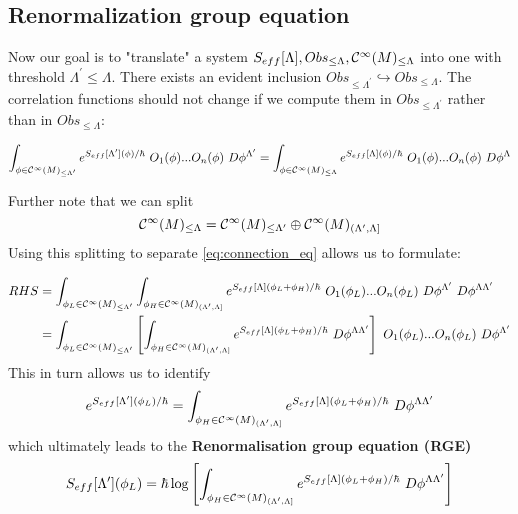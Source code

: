\subsection{Renormalization group equation}
\label{subsec:renorm_group_eq}

Now our goal is to "translate" a system $S_{eff}[\Lambda], Obs_{\leq \Lambda}, \mathcal{C}^{\infty}(M)_{\leq \Lambda}$ into one with threshold $\Lambda^\prime \leq \Lambda$. There exists an evident inclusion $Obs_{\leq \Lambda^\prime} \hookrightarrow Obs_{\leq \Lambda}$. The correlation functions should not change if we compute them in $Obs_{\leq \Lambda^\prime}$ rather than in $Obs_{\leq \Lambda}$:

\begin{align}
\label{eq:connection_eq}
  \int_{\phi \in \Ci(M)_{\leq \Lambda^\prime}} e^{S_{eff}[\Lambda^\prime] (\phi) / \hbar} \ O_1(\phi) ... O_n(\phi) \ D\phi^{\Lambda^\prime} = \int_{\phi \in \Ci(M)_{\leq \Lambda}} e^{S_{eff}[\Lambda] (\phi) / \hbar} \ O_1(\phi) ... O_n(\phi) \ D\phi^{\Lambda}
\end{align}

Further note that we can split
$$ \mathcal{C}^{\infty}(M)_{\leq \Lambda} = \mathcal{C}^{\infty}(M)_{\leq \Lambda^\prime} \oplus \mathcal{C}^{\infty}(M)_{(\Lambda^\prime,\Lambda]} $$
Using this splitting to separate \eqref{eq:connection_eq} allows us to formulate:

\begin{align*}
  RHS &= \int_{\phi_L \in \Ci(M)_{\leq \Lambda^\prime}}
  \int_{\phi_H \in \Ci(M)_{(\Lambda^\prime,\Lambda]}}
  e^{S_{eff}[\Lambda] (\phi_L + \phi_H) / \hbar} \ O_1(\phi_L) ... O_n(\phi_L) \ D\phi^{\Lambda^\prime} \ D\phi^{\Lambda \Lambda^\prime} \\
  &= \int_{\phi_L \in \Ci(M)_{\leq \Lambda^\prime}}
  \left [\int_{\phi_H \in \Ci(M)_{(\Lambda^\prime,\Lambda]}}
  e^{S_{eff}[\Lambda] (\phi_L + \phi_H) / \hbar} \ D\phi^{\Lambda \Lambda^\prime} \right] \ O_1(\phi_L) ... O_n(\phi_L) \ D\phi^{\Lambda^\prime} \\
\end{align*}
This in turn allows us to identify
$$ e^{S_{eff}[\Lambda^\prime](\phi_L)/\hbar}
= \int_{\phi_H \in \Ci(M)_{(\Lambda^\prime,\Lambda]}}
e^{S_{eff}[\Lambda] (\phi_L + \phi_H) / \hbar} \ D\phi^{\Lambda \Lambda^\prime} $$
which ultimately leads to the \textbf{Renormalisation group equation (RGE)}
\begin{align}
\label{eq:RGE}
  S_{eff}[\Lambda^\prime](\phi_L)
  = \hbar \log \left[ \int_{\phi_H \in \Ci(M)_{(\Lambda^\prime,\Lambda]}}
  e^{S_{eff}[\Lambda] (\phi_L + \phi_H) / \hbar} \ D\phi^{\Lambda \Lambda^\prime} \right]
\end{align}


